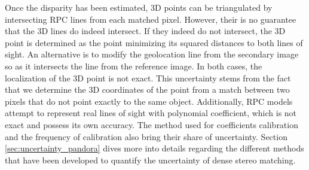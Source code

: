 Once the disparity has been estimated, 3D points can be triangulated by intersecting RPC lines from each matched pixel. However, their is no guarantee that the 3D lines do indeed intersect. If they indeed do not intersect, the 3D point is determined as the point minimizing its squared distances to both lines of sight. An alternative is to modify the geolocation line from the secondary image so as it intersects the line from the reference image. In both cases, the localization of the 3D point is not exact. This uncertainty stems from the fact that we determine the 3D coordinates of the point from a match between two pixels that do not point exactly to the same object. Additionally, RPC models attempt to represent real lines of sight with polynomial coefficient, which is not exact and possess its own accuracy. The method used for coefficients calibration and the frequency of calibration also bring their share of uncertainty. Section \ref{sec:uncertainty_pandora} dives more into details regarding the different methods that have been developed to quantify the uncertainty of dense stereo matching.

